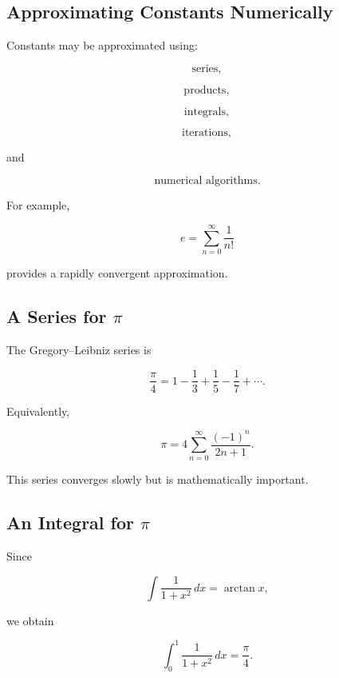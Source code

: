 \subsection{Approximating Constants Numerically}
\label{subsec:approximating-constants}

Constants may be approximated using:

\[
\boxed{
\text{series},
}
\]

\[
\boxed{
\text{products},
}
\]

\[
\boxed{
\text{integrals},
}
\]

\[
\boxed{
\text{iterations},
}
\]

and

\[
\boxed{
\text{numerical algorithms}.
}
\]

For example,

\[
e
=
\sum_{n=0}^{\infty}
\frac{1}{n!}
\]

provides a rapidly convergent approximation.

\subsection{A Series for \(\pi\)}
\label{subsec:pi-series-reference}

The Gregory--Leibniz series is

\[
\boxed{
\frac{\pi}{4}
=
1
-
\frac13
+
\frac15
-
\frac17
+
\cdots.
}
\]

Equivalently,

\[
\boxed{
\pi
=
4
\sum_{n=0}^{\infty}
\frac{(-1)^n}{2n+1}.
}
\]

This series converges slowly but is mathematically important.

\subsection{An Integral for \(\pi\)}
\label{subsec:pi-integral-reference}

Since

\[
\int\frac{1}{1+x^2}\,dx
=
\arctan x,
\]

we obtain

\[
\boxed{
\int_0^1
\frac{1}{1+x^2}\,dx
=
\frac{\pi}{4}.
}
\]

